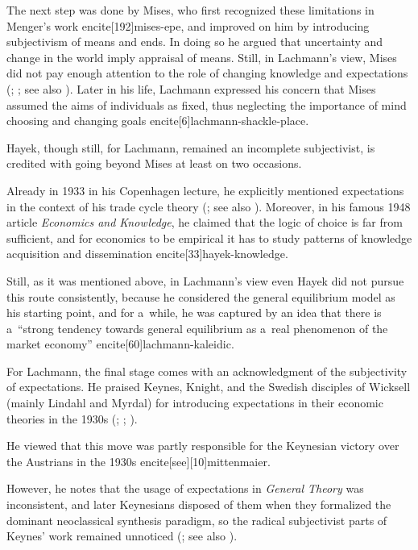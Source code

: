 {The next step was done by Mises, who first recognized these limitations in Menger's work encite[192]{mises-epe}, and improved on him by introducing subjectivism of means and ends. In doing so he argued that uncertainty and change in the world imply appraisal of means. Still, in Lachmann's view, Mises did not pay enough attention to the role of changing knowledge and expectations (\cite[57]{lachmann-expectations}; \citeyear[37]{lachmann-extension}; see also \cite[65--66]{koppl}). Later in his life, Lachmann expressed his concern that Mises assumed the aims of individuals as fixed, thus neglecting the importance of mind choosing and changing goals encite[6]{lachmann-shackle-place}.



Hayek, though still, for Lachmann, remained an incomplete subjectivist, is credited with going beyond Mises at least on two occasions.

Already in 1933 in his Copenhagen lecture, he explicitly mentioned expectations in the context of his trade cycle theory (\cite{hayek-1933}; see also \cite[259]{lachmann-hicks-neo}). Moreover, in his famous 1948 article \emph{Economics and Knowledge}, he claimed that the logic of choice is far from sufficient, and for economics to be empirical it has to study patterns of knowledge acquisition and dissemination encite[33]{hayek-knowledge}.

Still, as it was mentioned above, in Lachmann's view even Hayek did not pursue this route consistently, because he considered the general equilibrium model as his starting point, and for a~while, he was captured by an idea that there is a~``strong tendency towards general equilibrium as a~real phenomenon of the market economy'' encite[60]{lachmann-kaleidic}.



For Lachmann, the final stage comes with an acknowledgment of the subjectivity of expectations. He praised Keynes, Knight, and the Swedish disciples of Wicksell (mainly Lindahl and Myrdal) for introducing expectations in their economic theories in the 1930s (\cite[141]{lachmann-notes}; \citeyear[157--158]{lachmann-individualism}; \citeyear[5]{lachmann-shackle-place}).

He viewed that this move was partly responsible for the Keynesian victory over the Austrians in the 1930s encite[see][10]{mittenmaier}.

However, he notes that the usage of expectations in \emph{General Theory} was inconsistent, and later Keynesians disposed of them when they formalized the dominant neoclassical synthesis paradigm, so the radical subjectivist parts of Keynes' work remained unnoticed (\cite[141--142]{lachmann-notes}; see also \cite[221]{lachmann-vicissitudes}).

}
